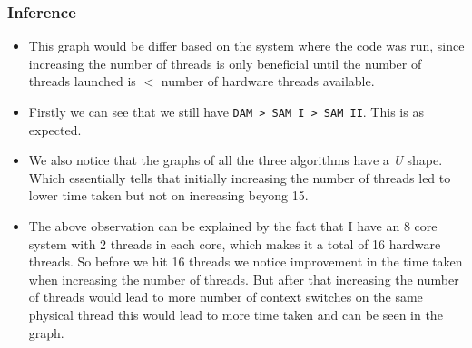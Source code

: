 \documentclass[a4paper,12pt]{report}
\begin{document}
\subsubsection{Inference}
\begin{itemize}
\item This graph would be differ based on the system where the code was run, since increasing the number of threads is only beneficial until the number of threads launched is $<$ number of hardware threads available.
\item Firstly we can see that we still have \texttt{DAM > SAM I > SAM II}. This is as expected.
\item We also notice that the graphs of all the three algorithms have a \textit{U} shape. Which essentially tells that initially increasing the number of threads led to lower time taken but not on increasing beyong 15.
\item The above observation can be explained by the fact that I have an 8 core system with 2 threads in each core, which makes it a total of 16 hardware threads. So before we hit 16 threads we notice improvement in the time taken when increasing the number of threads. But after that increasing the number of threads would lead to more number of context switches on the same physical thread this would lead to more time taken and can be seen in the graph.
\end{itemize}
\newpage
\end{document}
